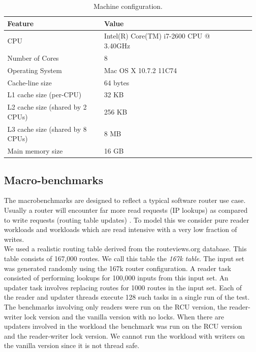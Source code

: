 \documentclass[a4paper,marginparwidth=50pt,marginparsep=10pt]{article}
\begin{document}
\begin{table}
\begin{center}
\begin{tabular}{|l|l|l|l|l|l|}
\hline Feature & Value\\
\hline CPU &Intel(R) Core(TM) i7-2600 CPU @ 3.40GHz\\
\hline Number of Cores & 8\\
\hline Operating System & Mac OS X 10.7.2 11C74\\
\hline Cache-line size & 64 bytes\\
\hline L1 cache size (per-CPU) & 32 KB\\
\hline L2 cache size (shared by 2 CPUs) & 256 KB\\
\hline L3 cache size (shared by 8 CPUs)& 8 MB\\
\hline Main memory size & 16 GB\\
\hline
\end{tabular}
\end{center}
\caption{Machine configuration.}
\label{tbl:machinemac}
\end{table}

\subsection{Macro-benchmarks}
\label{sec:macrobenchmarks}

The macrobenchmarks are designed to reflect a typical software router
use case. Usually a router will encounter far more read requests (IP
lookups) as compared to write requests (routing table updates) . To
model this we consider pure reader workloads and workloads which are
read intensive with a very low fraction of writes.\\

We used a realistic routing table derived from the routeviews.org
database\cite{routeviews}. This table consists of 167,000 routes. We call this table
the \emph{167k table}. The input set was generated randomly using the
167k router configuration. A reader task consisted of performing
lookups for 100,000 inputs from this input set. An updater task
involves replacing routes for 1000 routes in the input set. Each of
the reader and updater threads execute 128 such tasks in a single run
of the test.\\

The benchmarks involving only readers were run on the RCU version,
the reader-writer lock version and the vanilla version with no
locks. When there are updaters involved in the workload the benchmark
was run on the RCU version and the reader-writer lock version. We
cannot run the workload with writers on the vanilla version since it
is not thread safe.
\end{document}
